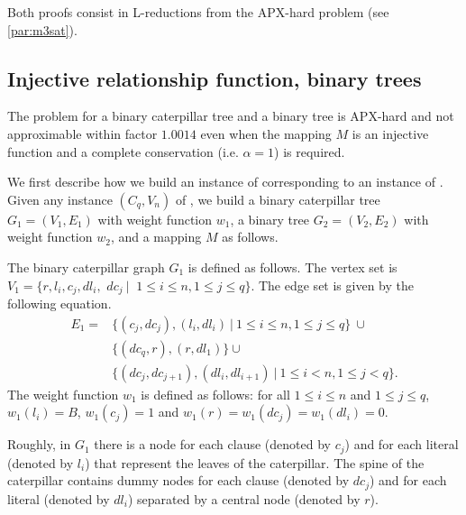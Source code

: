 		Both proofs consist in L-reductions from the APX-hard \msat{} problem (see \cref{par:m3sat}).


		\subsection{Injective relationship function, binary trees}
		\label{subsec:apx-bt-cater}

		\begin{proposition}\label{prop:apx-bt-cater}
			The \mwccs{} problem for a binary caterpillar tree and a binary tree is APX-hard and not approximable within factor $1.0014$ even when the mapping $M$ is an injective function and a complete conservation (i.e. $\alpha = 1$) is required.
		\end{proposition}

		We first describe how we build an instance of \mwccs{} corresponding to an instance of \msat{}. Given any instance $(C_q,V_n)$ of \msat{}, we build a binary caterpillar tree $G_1=(V_1,E_1)$ with weight function $w_1$, a binary tree $G_2=(V_2,E_2)$ with weight function $w_2$, and a mapping $M$ as follows.

		The binary caterpillar graph $G_1$ is defined as follows. The vertex set is $V_1=\{r, l_i, c_j, dl_i, $ $dc_j ~\vert~$ $ 1\leq i\leq n, 1\leq j \leq q\}$. The edge set is given by the following equation.
		\begin{align*}
		E_1= &\{(c_j,dc_j), (l_i,dl_i) ~\vert~ 1\leq i\leq n, 1\leq j \leq q\}~\cup \\
		&\{(dc_q,r), (r,dl_1)\} \cup \\
		& \{(dc_j,dc_{j+1}), (dl_i,dl_{i+1}) ~\vert~ 1\leq i< n, 1\leq j < q\}.
		\end{align*}
		The weight function $w_1$ is defined as follows: for all $1 \leq i\leq n$ and $1\leq j \leq q$, $w_1(l_i)=B$, $w_1(c_j)=1$ and $w_1(r)=w_1(dc_j)=w_1(dl_i)=0$.

		Roughly, in $G_1$ there is a node for each clause (denoted by $c_j$) and for each literal (denoted by $l_i$) that represent the leaves of the caterpillar. The spine of the caterpillar contains dummy nodes for each clause (denoted by $dc_j$) and for each literal (denoted by $dl_i$) separated by a central node (denoted by $r$).

